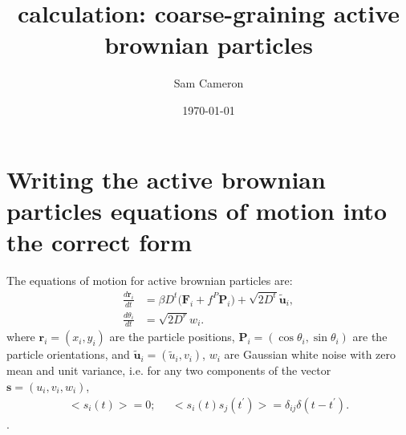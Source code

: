 \documentclass[twocolumn,amsmath,amssymb,aps]{revtex4-1}%
\begin{document}
\title{calculation: coarse-graining active brownian particles}
\author{Sam Cameron}
%
\date{\today}

\begin{abstract}
\end{abstract}

\maketitle

\section{Writing the active brownian particles equations of motion into
  the correct form}

The equations of motion for active brownian particles are:
\begin{subequations}
  \label{eqs:basicABPsODEs}
  \begin{align}
    \frac{d\bm{r}_i}{dt}&=\beta D^t\big(\bm{F}_i
    +f^P\bm{P}_i\big)
    +\sqrt{2D^t}\tilde{\bm{u}}_i,\label{eq:micro_pos}\\
    \frac{d\theta_i}{dt}&=\sqrt{2D^r}w_i.\label{eq:micro_theta}
  \end{align}
\end{subequations}
where $\bm{r}_i=(x_i,y_i)$ are the particle positions,
$\bm{P}_i=(\cos\theta_i,\sin\theta_i)$ are the particle orientations,
and $\tilde{\bm{u}}_i=(\tilde{u}_i,v_i)$, $w_i$ are Gaussian white noise
with zero mean and unit variance, i.e. for any two components of the vector
$\bm{s}=(u_i,v_i,w_i)$,
\begin{align}
  \big<s_i(t)\big>=0;\;\;\;\;\; \big<s_i(t)s_j(t^{\prime})\big>=
  \delta_{ij}\delta(t-t^{\prime}).
\end{align}.
\end{document}
